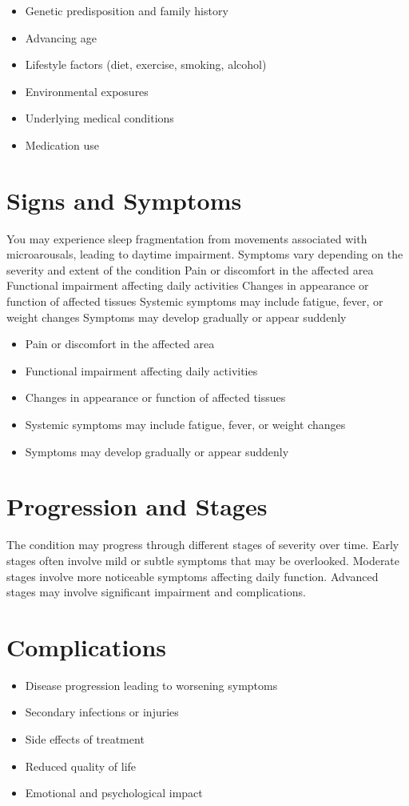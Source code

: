 \begin{itemize}[noitemsep]
  \item Genetic predisposition and family history
  \item Advancing age
  \item Lifestyle factors (diet, exercise, smoking, alcohol)
  \item Environmental exposures
  \item Underlying medical conditions
  \item Medication use
\end{itemize}
\section{Signs and Symptoms}
You may experience sleep fragmentation from movements associated with microarousals, leading to daytime impairment. Symptoms vary depending on the severity and extent of the condition Pain or discomfort in the affected area Functional impairment affecting daily activities Changes in appearance or function of affected tissues Systemic symptoms may include fatigue, fever, or weight changes Symptoms may develop gradually or appear suddenly

\begin{itemize}[noitemsep]
  \item Pain or discomfort in the affected area
  \item Functional impairment affecting daily activities
  \item Changes in appearance or function of affected tissues
  \item Systemic symptoms may include fatigue, fever, or weight changes
  \item Symptoms may develop gradually or appear suddenly
\end{itemize}
\section{Progression and Stages}
The condition may progress through different stages of severity over time. Early stages often involve mild or subtle symptoms that may be overlooked. Moderate stages involve more noticeable symptoms affecting daily function. Advanced stages may involve significant impairment and complications.
\section{Complications}
\begin{itemize}[noitemsep]
  \item Disease progression leading to worsening symptoms
  \item Secondary infections or injuries
  \item Side effects of treatment
  \item Reduced quality of life
  \item Emotional and psychological impact
\end{itemize}
